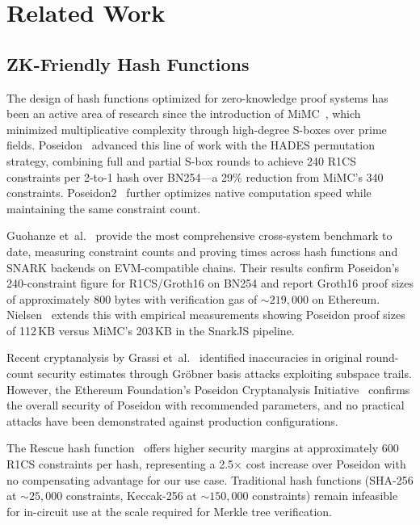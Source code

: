 
\section{Related Work}
\label{sec:related-work}

\subsection{ZK-Friendly Hash Functions}

The design of hash functions optimized for zero-knowledge proof systems has been an active area of research since the introduction of MiMC~\cite{albrecht2016mimc}, which minimized multiplicative complexity through high-degree S-boxes over prime fields. Poseidon~\cite{grassi2021poseidon} advanced this line of work with the HADES permutation strategy, combining full and partial S-box rounds to achieve 240 R1CS constraints per 2-to-1 hash over BN254---a 29\% reduction from MiMC's 340 constraints. Poseidon2~\cite{grassi2023poseidon2} further optimizes native computation speed while maintaining the same constraint count.

Guohanze et~al.~\cite{guohanze2024benchmarking} provide the most comprehensive cross-system benchmark to date, measuring constraint counts and proving times across hash functions and SNARK backends on EVM-compatible chains. Their results confirm Poseidon's 240-constraint figure for R1CS/Groth16 on BN254 and report Groth16 proof sizes of approximately 800 bytes with verification gas of ${\sim}219{,}000$ on Ethereum. Nielsen~\cite{nielsen2023snark} extends this with empirical measurements showing Poseidon proof sizes of 112\,KB versus MiMC's 203\,KB in the SnarkJS pipeline.

Recent cryptanalysis by Grassi et~al.~\cite{grassi2025grobner} identified inaccuracies in original round-count security estimates through Gr\"{o}bner basis attacks exploiting subspace trails. However, the Ethereum Foundation's Poseidon Cryptanalysis Initiative~\cite{ethereum2024poseidon} confirms the overall security of Poseidon with recommended parameters, and no practical attacks have been demonstrated against production configurations.

The Rescue hash function~\cite{aly2019rescue} offers higher security margins at approximately 600 R1CS constraints per hash, representing a 2.5$\times$ cost increase over Poseidon with no compensating advantage for our use case. Traditional hash functions (SHA-256 at ${\sim}25{,}000$ constraints, Keccak-256 at ${\sim}150{,}000$ constraints) remain infeasible for in-circuit use at the scale required for Merkle tree verification.

